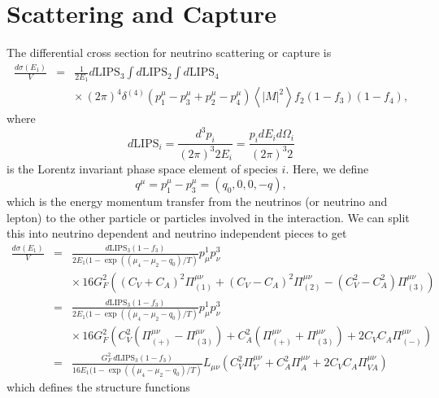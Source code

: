 \documentclass[12pt,letter]{article}
\begin{document}
\section{Scattering and Capture} 
The differential cross section for neutrino scattering or capture is 
\begin{eqnarray*}
\frac{d \sigma(E_1)}{V} &=& \frac{1}{2 E_1} d\textrm{LIPS}_3 \int d\textrm{LIPS}_2 
\int d\textrm{LIPS}_4 \\
&& \times \, (2 \pi)^4 \delta^{(4)}\left(p^\mu_1 - p^\mu_3 + p^\mu_2 - p^\mu_4 \right)
\left\langle \left| M \right|^2 \right \rangle f_2 (1-f_3) (1-f_4),
\end{eqnarray*}
where 
\begin{equation*}
d\textrm{LIPS}_i = \frac{d^3p_i}{(2\pi)^3 2 E_i} 
= \frac{p_i dE_i d \Omega_i}{(2\pi)^3 2} 
\end{equation*}
is the Lorentz invariant phase space element of species $i$.  Here, we define 
\begin{equation}
q^\mu = p_1^\mu - p_3^\mu=(q_0,0,0,-q),
\end{equation}
which is the energy momentum transfer from the neutrinos (or neutrino and lepton) to the other particle or particles involved in the interaction.  We can split this into neutrino dependent and neutrino independent pieces to get 
\begin{eqnarray*}
\frac{d \sigma(E_1)}{V} &=& \frac{d\textrm{LIPS}_3 (1-f_3) }{2 E_1(1- \exp((\mu_4 - \mu_2 - q_0)/T)}  
p^1_\mu p^3_\nu \\
&&\times \, 16 G_F^2\left( 
 (C_V+C_A)^2 \Pi_{(1)}^{\mu \nu}
+(C_V-C_A)^2 \Pi_{(2)}^{\mu \nu}
-(C_V^2-C_A^2) \Pi_{(3)}^{\mu \nu} \right) \\
&=& \frac{d\textrm{LIPS}_3 (1-f_3)}{2 E_1(1- \exp((\mu_4 - \mu_2 - q_0)/T)}   
p^1_\mu p^3_\nu \\
&&\times \, 16 G_F^2\left( 
  C_V^2 \left(\Pi_{(+)}^{\mu \nu} - \Pi_{(3)}^{\mu \nu} \right) 
+ C_A^2 \left(\Pi_{(+)}^{\mu \nu} + \Pi_{(3)}^{\mu \nu} \right) 
+ 2 C_V C_A \Pi_{(-)}^{\mu \nu}
 \right) \\
&=& \frac{G_F^2 \, d\textrm{LIPS}_3 (1-f_3)}
{16 E_1(1 - \exp((\mu_4 - \mu_2 - q_0)/T)} 
 L_{\mu \nu} 
\left( 
  C_V^2 \Pi_V^{\mu \nu} 
+ C_A^2 \Pi_A^{\mu \nu}
+ 2 C_V C_A \Pi_{VA}^{\mu \nu}
 \right )
\end{eqnarray*}
which defines the structure functions 
\end{document}
